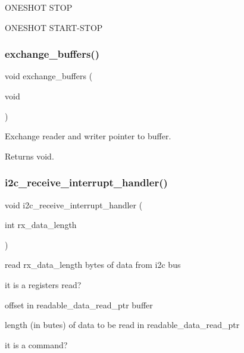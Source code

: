 O\+N\+E\+S\+H\+OT S\+T\+OP

O\+N\+E\+S\+H\+OT S\+T\+A\+R\+T-\/\+S\+T\+OP \mbox{\label{i2c-th_8ino_a46696a96b3118b5d8900703c054166c8}} 
\subsubsection{\texorpdfstring{exchange\+\_\+buffers()}{exchange\_buffers()}}
{\footnotesize\ttfamily void exchange\+\_\+buffers (\begin{DoxyParamCaption}\item[{void}]{ }\end{DoxyParamCaption})}



Exchange reader and writer pointer to buffer. 

\begin{DoxyReturn}{Returns}
void. 
\end{DoxyReturn}
\mbox{\label{i2c-th_8ino_a6e27532df66f6bf186654355def5c9af}} 
\subsubsection{\texorpdfstring{i2c\+\_\+receive\+\_\+interrupt\+\_\+handler()}{i2c\_receive\_interrupt\_handler()}}
{\footnotesize\ttfamily void i2c\+\_\+receive\+\_\+interrupt\+\_\+handler (\begin{DoxyParamCaption}\item[{int}]{rx\+\_\+data\+\_\+length }\end{DoxyParamCaption})}

read rx\+\_\+data\+\_\+length bytes of data from i2c bus

it is a registers read?

offset in readable\+\_\+data\+\_\+read\+\_\+ptr buffer

length (in butes) of data to be read in readable\+\_\+data\+\_\+read\+\_\+ptr

it is a command?

